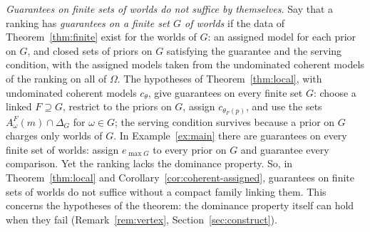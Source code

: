 \documentclass[11pt]{article}
\theoremstyle{definition}
\theoremstyle{remark}
\begin{document}
\emph{Guarantees on finite sets of worlds do not suffice by themselves.} Say that a ranking has \emph{guarantees on a finite set $G$ of worlds} if the data of Theorem~\ref{thm:finite} exist for the worlds of $G$: an assigned model for each prior on $G$, and closed sets of priors on $G$ satisfying the guarantee and the serving condition, with the assigned models taken from the undominated coherent models of the ranking on all of $\Omega$. The hypotheses of Theorem~\ref{thm:local}, with undominated coherent models $c_\theta$, give guarantees on every finite set $G$: choose a linked $F\supseteq G$, restrict to the priors on $G$, assign $c_{\theta_F(p)}$, and use the sets $A^F_\omega(m)\cap\Delta_G$ for $\omega\in G$; the serving condition survives because a prior on $G$ charges only worlds of $G$. In Example~\ref{ex:main} there are guarantees on every finite set of worlds: assign $e_{\max G}$ to every prior on $G$ and guarantee every comparison. Yet the ranking lacks the dominance property. So, in Theorem~\ref{thm:local} and Corollary~\ref{cor:coherent-assigned}, guarantees on finite sets of worlds do not suffice without a compact family linking them. This concerns the hypotheses of the theorem: the dominance property itself can hold when they fail (Remark~\ref{rem:vertex}, Section~\ref{sec:construct}).
\end{document}
